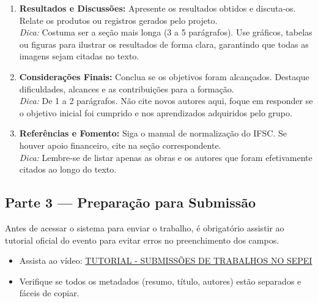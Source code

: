\begin{boxAtividade}
\begin{enumerate}
    \item \textbf{Resultados e Discussões:} Apresente os resultados obtidos e discuta-os. Relate os produtos ou registros gerados pelo projeto.\\
    \textit{Dica:} Costuma ser a seção mais longa (3 a 5 parágrafos). Use gráficos, tabelas ou figuras para ilustrar os resultados de forma clara, garantindo que todas as imagens sejam citadas no texto.

    \item \textbf{Considerações Finais:} Conclua se os objetivos foram alcançados. Destaque dificuldades, alcances e as contribuições para a formação.\\
    \textit{Dica:} De 1 a 2 parágrafos. Não cite novos autores aqui, foque em responder se o objetivo inicial foi cumprido e nos aprendizados adquiridos pelo grupo.

    \item \textbf{Referências e Fomento:} Siga o manual de normalização do IFSC. Se houver apoio financeiro, cite na seção correspondente.\\
    \textit{Dica:} Lembre-se de listar apenas as obras e os autores que foram efetivamente citados ao longo do texto.
\end{enumerate}

\end{boxAtividade}


\subsection{Parte 3 — Preparação para Submissão}

\begin{boxAtividade}

Antes de acessar o sistema para enviar o trabalho, é obrigatório assistir ao tutorial oficial do evento para evitar erros no preenchimento dos campos.

\begin{itemize}
\item Assista ao vídeo: \href{https://youtu.be/nArmca8ned4?si=ARA3-_HG5KX8TToX}{TUTORIAL - SUBMISSÕES DE TRABALHOS NO SEPEI}
\item Verifique se todos os metadados (resumo, título, autores) estão separados e fáceis de copiar.
\end{itemize}

\end{boxAtividade}

